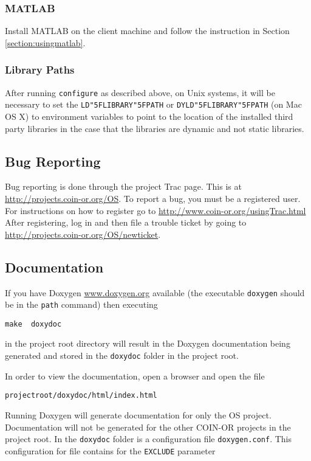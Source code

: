 \documentclass[11pt]{article}
\renewcommand{\_}{{\char"5F}}
\renewcommand{\{}{{\char"7B}}
\renewcommand{\}}{{\char"7D}}
\renewcommand{\^}{{\char"0D}}
\renewcommand{\'}{{\char"0D}}
\begin{document}
\subsubsection{MATLAB}

Install MATLAB on the client machine and follow the instruction in Section
 \ref{section:usingmatlab}.

\subsubsection{Library Paths}

After running {\tt configure} as described above,  on Unix systems, it will be necessary to set the {\tt LD\_LIBRARY\_PATH} or {\tt DYLD\_LIBRARY\_PATH} (on Mac OS X) to environment variables to point to the location of the installed third party libraries in the case that the libraries are dynamic and not static libraries. 


\subsection{Bug Reporting}

Bug reporting is done through the project Trac page. This is at \url{http://projects.coin-or.org/OS}.  To report a bug, you must be a registered user.  For  instructions on  how to register go to 
 \url{http://www.coin-or.org/usingTrac.html}  After registering, log in and then file a trouble ticket by going to \url{http://projects.coin-or.org/OS/newticket}.
 
 
\subsection{Documentation}\label{section:documentation}

If you have Doxygen  \url{www.doxygen.org} available (the executable {\tt doxygen} should be in the {\tt path} command) then executing
\begin{verbatim}
make  doxydoc
\end{verbatim}
in the project root directory will result in the Doxygen documentation being generated and stored in the {\tt doxydoc} folder in the project root. 

In order to view the documentation, open a browser and open the file 
\begin{verbatim}
projectroot/doxydoc/html/index.html
\end{verbatim}

Running Doxygen will generate documentation for only the  OS project.  Documentation will not be generated for the other COIN-OR projects in the project root. In the {\tt doxydoc}  folder is a configuration file {\tt doxygen.conf}.  This configuration for file contains for the {\tt EXCLUDE} parameter
\end{document}
